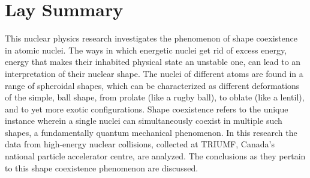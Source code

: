 

\chapter{Lay Summary}

This nuclear physics research investigates the phenomenon of shape coexistence in atomic nuclei. The ways in which energetic nuclei get rid of excess energy, energy that makes their inhabited physical state an unstable one, can lead to an interpretation of their nuclear shape. The nuclei of different atoms are found in a range of spheroidal shapes, which can be characterized as different deformations of the simple, ball shape, from prolate (like a rugby ball), to oblate (like a lentil), and to yet more exotic configurations. Shape coexistence refers to the unique instance wherein a single nuclei can simultaneously coexist in multiple such shapes, a fundamentally quantum mechanical phenomenon. In this research the data from high-energy nuclear collisions, collected at TRIUMF, Canada's national particle accelerator centre, are analyzed. The conclusions as they pertain to this shape coexistence phenomenon are discussed.  \newline


